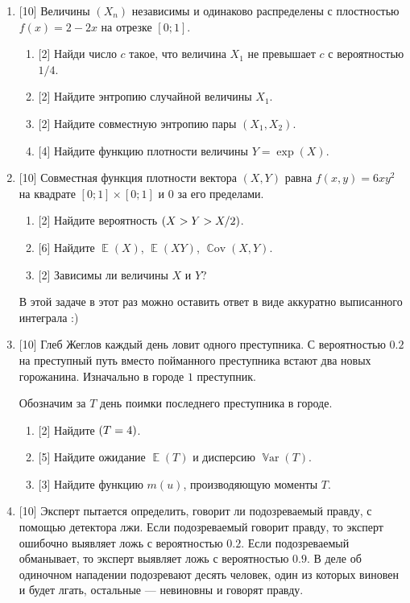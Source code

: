\documentclass[12pt]{article}
\DeclareMathOperator{\Cov}{\mathbb{C}ov}
\DeclareMathOperator{\Var}{\mathbb{V}ar}
\let\P\relax
\DeclareMathOperator{\P}{\mathbb{P}}
\DeclareMathOperator{\E}{\mathbb{E}}
\begin{document}
\begin{enumerate}
    \item {[10]} Величины $(X_n)$ независимы и одинаково распределены с плостностью $f(x) = 2 - 2x$ на отрезке $[0;1]$.
    \begin{enumerate}
        \item {[2]} Найди число $c$ такое, что величина $X_1$ не превышает $c$ с вероятностью $1/4$.
        \item {[2]} Найдите энтропию случайной величины $X_1$.
        \item {[2]} Найдите совместную энтропию пары $(X_1, X_2)$.
        \item {[4]} Найдите функцию плотности величины $Y = \exp(X)$.
    \end{enumerate}

    \item {[10]} Совместная функция плотности вектора $(X, Y)$ равна $f(x, y) = 6xy^2$ на квадрате $[0;1] \times [0;1]$ и $0$ за его пределами. 
    \begin{enumerate}
        \item {[2]} Найдите вероятность $\P(X > Y > X/2)$. 
        \item {[6]} Найдите $\E(X)$, $\E(XY)$, $\Cov(X, Y)$.
        \item {[2]} Зависимы ли величины $X$ и $Y$?
    \end{enumerate}
    
    В этой задаче в этот раз можно оставить ответ в виде аккуратно выписанного интеграла :)
   

    \item {[10]} Глеб Жеглов каждый день ловит одного преступника.
    С вероятностью $0.2$ на преступный путь вместо пойманного преступника встают два новых горожанина. 
    Изначально в городе $1$ преступник. 
    
    Обозначим за $T$ день поимки последнего преступника в городе. 

    \begin{enumerate}
      \item {[2]} Найдите $\P(T = 4)$.
      \item {[5]} Найдите ожидание $\E(T)$ и дисперсию $\Var(T)$.
      \item {[3]} Найдите функцию $m(u)$, производяющую моменты $T$.
    \end{enumerate}

    
    
    \item {[10]} Эксперт пытается определить, говорит ли подозреваемый правду, с помощью детектора лжи.
    Если подозреваемый говорит правду, то эксперт ошибочно выявляет ложь с вероятностью $0.2$. 
    Если подозреваемый обманывает, то эксперт выявляет ложь с вероятностью $0.9$. 
    В деле об одиночном нападении подозревают десять человек, один из которых виновен и будет лгать, 
    остальные — невиновны и говорят правду.
    

\end{enumerate}
\end{document}
